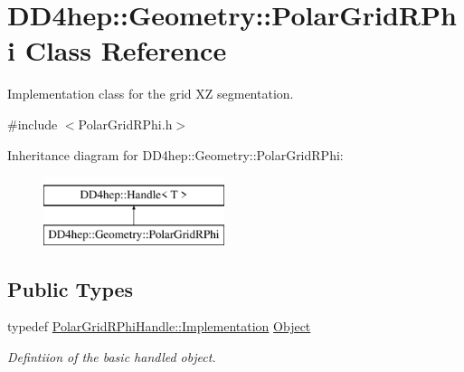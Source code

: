 \hypertarget{class_d_d4hep_1_1_geometry_1_1_polar_grid_r_phi}{}\section{D\+D4hep\+:\+:Geometry\+:\+:Polar\+Grid\+R\+Phi Class Reference}
\label{class_d_d4hep_1_1_geometry_1_1_polar_grid_r_phi}


Implementation class for the grid XZ segmentation.  




{\ttfamily \#include $<$Polar\+Grid\+R\+Phi.\+h$>$}

Inheritance diagram for D\+D4hep\+:\+:Geometry\+:\+:Polar\+Grid\+R\+Phi\+:\begin{figure}[H]
\begin{center}
\leavevmode
\includegraphics[height=2.000000cm]{class_d_d4hep_1_1_geometry_1_1_polar_grid_r_phi}
\end{center}
\end{figure}
\subsection*{Public Types}
\begin{DoxyCompactItemize}
\item 
typedef \hyperlink{class_d_d4hep_1_1_handle_ad7ff728a25806079516b8965b9113f1a}{Polar\+Grid\+R\+Phi\+Handle\+::\+Implementation} \hyperlink{class_d_d4hep_1_1_geometry_1_1_polar_grid_r_phi_aebd15faef8872b8331cb2a153d5665bd}{Object}
\begin{DoxyCompactList}\small\item\em Defintiion of the basic handled object. \end{DoxyCompactList}\end{DoxyCompactItemize}

